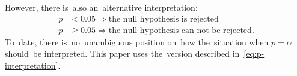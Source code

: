 \documentclass[russian,english]{scrreprt}
\begin{document}
However, there is~also an~alternative interpretation:
\begin{equation}\label{eq:p-interpretation-2}
\begin{aligned}
p &< 0.05 \Rightarrow \text{the~null hypothesis is~rejected}\\
p &\geq 0.05 \Rightarrow \text{the~null hypothesis can~not~be rejected}.
\end{aligned}
\end{equation}
To~date, there is~no~unambiguous position on~how the~situation when $p = \alpha$ should~be interpreted. This paper uses the~version described in~\ref{eq:p-interpretation}.
%
\clearpage

\nocite{Essential-Statistical-Inference}
\nocite{AUC-optimization}
\nocite{Mann-Whitney-1947}
\nocite{Optimizing-classifier-performance}
\nocite{ROC-R-1}
\nocite{ROC-AUC-1}
\nocite{ROC-AUC-meets-U-R-1}

\printbibliography
\end{document}
